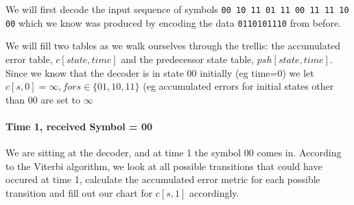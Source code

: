 We will first decode the input sequence of symbols
\texttt{00 10 11 01 11 00 11 11 10 00} which we know was
produced by encoding the data \texttt{0110101110} from before.

We will fill two tables as we walk ourselves through the trellis:
the accumulated error table, $c[state,time]$ and the predecessor state
table, $psh[state,time]$. Since we know that the decoder is in state 00 
initially (eg time=0) we let $c[s,0]=\infty, for s\in\{01,10,11\}$ (eg accumulated errors 
for initial states other than 00 are set to $\infty$

\paragraph{Time 1, received Symbol = 00}
We are sitting at the decoder, and at time 1 the symbol 00 comes in. According to
the Viterbi algorithm, we look at all possible transitions that could have occured 
at time 1, calculate the accumulated error metric for each possible transition and fill
out our chart for $c[s,1]$ accordingly.

